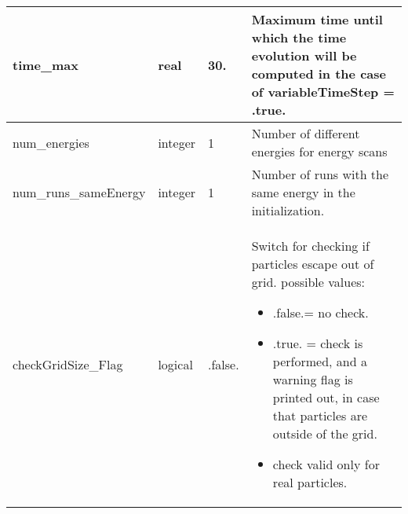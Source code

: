 \documentclass{article}
\begin{document}
\begin{longtable}{llll}
\midrule
time\_max & \begin{minipage}[t]{2cm}real\end{minipage} & \begin{minipage}[t]{2cm}30.\end{minipage} & \begin{minipage}[t]{12cm}Maximum time until which the time evolution will be computed in the case of variableTimeStep = .true.\end{minipage}\\*
\midrule
num\_energies & \begin{minipage}[t]{2cm}integer\end{minipage} & \begin{minipage}[t]{2cm}1\end{minipage} & \begin{minipage}[t]{12cm}Number of different energies for energy scans\end{minipage}\\*
\midrule
num\_runs\_sameEnergy & \begin{minipage}[t]{2cm}integer\end{minipage} & \begin{minipage}[t]{2cm}1\end{minipage} & \begin{minipage}[t]{12cm}Number of runs with the same energy in the initialization.\end{minipage}\\*
\midrule
checkGridSize\_Flag & \begin{minipage}[t]{2cm}logical\end{minipage} & \begin{minipage}[t]{2cm}.false.\end{minipage} & \begin{minipage}[t]{12cm}Switch for checking if particles escape out of grid. possible values:\begin{itemize}\leftmargin0em\itemindent0pt\item .false.= no check.\item .true. = check is performed, and a warning flag is printed out,   in case that particles are outside of the grid.\item check valid only for real particles.\end{itemize}\end{minipage}\\*
\midrule

\end{longtable}
\end{document}
